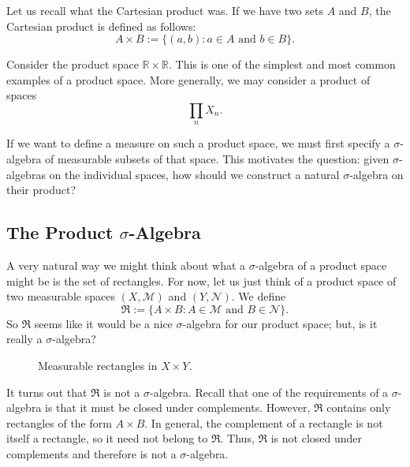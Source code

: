 \documentclass[11pt]{article}
\theoremstyle{definition}
\theoremstyle{plain}
\newcommand{\R}{\mathbb{R}}
\newcommand{\M}{\mathcal{M}}
\newcommand{\N}{\mathcal{N}}
\newcommand{\Rect}{\mathfrak{R}}
\begin{document}
Let us recall what the Cartesian product was. If we have two sets $A$
and $B$, the Cartesian product is defined as follows:
\[
  A \times B := \{ (a,b) : a \in A \text{ and } b \in B \}.
\]

Consider the product space $\R \times \R$. This is one of the simplest
and most common examples of a product space. More generally, we may
consider a product of spaces
\[
  \prod_{n} X_n.
\]

If we want to define a measure on such a product space, we must first
specify a $\sigma$-algebra of measurable subsets of that space. This
motivates the question: given $\sigma$-algebras on the individual
spaces, how should we construct a natural $\sigma$-algebra on their
product?

\subsection{The Product \texorpdfstring{$\sigma$}{sigma}-Algebra}

A very natural way we might think about what a $\sigma$-algebra of a
product space might be is the set of rectangles. For now, let us just
think of a product space of two measurable spaces $(X,\M)$ and
$(Y,\N)$. We define
\[
  \Rect := \{ A \times B : A \in \M \text{ and } B \in \N \}.
\]
So $\Rect$ seems like it would be a nice $\sigma$-algebra for our
product space; but, is it really a $\sigma$-algebra?

\begin{figure}[H]
\centering
{}
\caption{Measurable rectangles in $X \times Y$.}
\end{figure}

It turns out that $\Rect$ is not a $\sigma$-algebra. Recall that one of
the requirements of a $\sigma$-algebra is that it must be closed under
complements. However, $\Rect$ contains only rectangles of the form
$A \times B$. In general, the complement of a rectangle is not itself a
rectangle, so it need not belong to $\Rect$. Thus, $\Rect$ is not
closed under complements and therefore is not a $\sigma$-algebra.
\end{document}
